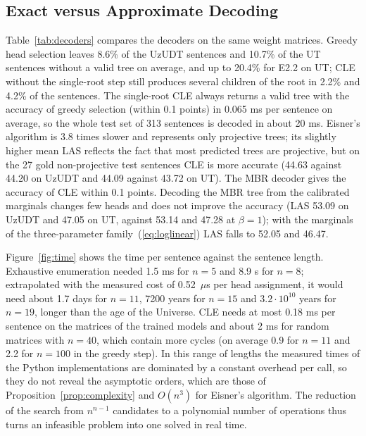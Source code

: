 \documentclass[mathematics,article,submit,pdftex,oneauthor]{Definitions/mdpi}
\begin{document}


\subsection{Exact versus Approximate Decoding}
Table~\ref{tab:decoders} compares the decoders on the same weight matrices.
Greedy head selection leaves 8.6\% of the UzUDT sentences and 10.7\% of the UT sentences without a valid tree on average, and up to 20.4\% for E2.2 on UT; CLE without the single-root step still produces several children of the root in 2.2\% and 4.2\% of the sentences.
The single-root CLE always returns a valid tree with the accuracy of greedy selection (within 0.1 points) in 0.065 ms per sentence on average, so the whole test set of 313 sentences is decoded in about 20 ms.
Eisner's algorithm is 3.8 times slower and represents only projective trees; its slightly higher mean LAS reflects the fact that most predicted trees are projective, but on the 27 gold non-projective test sentences CLE is more accurate (44.63 against 44.20 on UzUDT and 44.09 against 43.72 on UT).
The MBR decoder gives the accuracy of CLE within 0.1 points.
Decoding the MBR tree from the calibrated marginals changes few heads and does not improve the accuracy (LAS 53.09 on UzUDT and 47.05 on UT, against 53.14 and 47.28 at $\beta=1$); with the marginals of the three-parameter family~(\ref{eq:loglinear}) LAS falls to 52.05 and 46.47.



Figure~\ref{fig:time} shows the time per sentence against the sentence length.
Exhaustive enumeration needed 1.5 ms for $n=5$ and 8.9 s for $n=8$; extrapolated with the measured cost of 0.52~$\mu$s per head assignment, it would need about 1.7 days for $n=11$, 7200 years for $n=15$ and $3.2\cdot10^{10}$ years for $n=19$, longer than the age of the Universe.
CLE needs at most 0.18 ms per sentence on the matrices of the trained models and about 2 ms for random matrices with $n=40$, which contain more cycles (on average 0.9 for $n=11$ and 2.2 for $n=100$ in the greedy step).
In this range of lengths the measured times of the Python implementations are dominated by a constant overhead per call, so they do not reveal the asymptotic orders, which are those of Proposition~\ref{prop:complexity} and $O(n^3)$ for Eisner's algorithm.
The reduction of the search from $n^{n-1}$ candidates to a polynomial number of operations thus turns an infeasible problem into one solved in real time.
\end{document}
